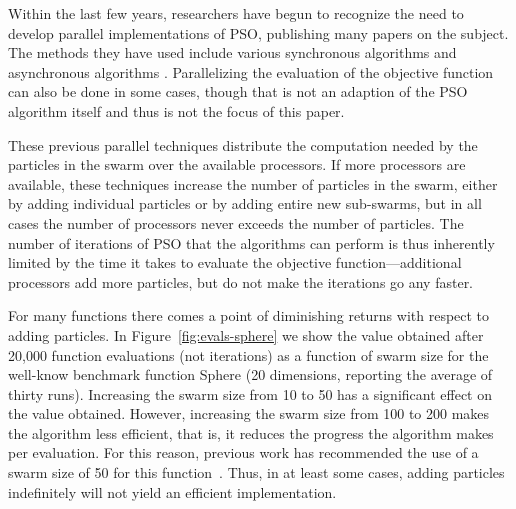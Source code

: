 \documentclass[journal,letterpaper]{IEEEtran}
\newcommand{\fig}[1]{Figure~\ref{fig:#1}}
\begin{document}
Within the last few years, researchers have begun to recognize the need to
develop parallel implementations of PSO, publishing many papers on the subject.
The methods they have used include various synchronous algorithms
\cite{mcnabb-2007-parallel-pso-using-mapreduce,belal-2004-parallel-models-for-pso,chu-2006-intelligent-parallel-pso,jin-2005-pso-antenna-designs,parsopoulos-2004-parallel-vector-evaluated-pso,schutte-2004-parallel-global-optimization-with-pso}
and asynchronous algorithms
\cite{koh-2006-parallel-asynchronous-pso,mostaghim-2006-multi-objective-pso-on-grids,venter-2005-parallel-pso-asynchronous-evaluations}.  Parallelizing the
evaluation of the objective function can also be done in some cases, though
that is not an adaption of the PSO algorithm itself and thus is not the focus
of this paper.

These previous parallel techniques distribute the computation needed by the
particles in the swarm over the available processors.  If more processors are
available, these techniques increase the number of particles in the swarm,
either by adding individual particles or by adding entire new sub-swarms, but
in all cases the number of processors never exceeds the number of particles.
The number of iterations of PSO that the algorithms can perform is thus
inherently limited by the time it takes to evaluate the objective
function---additional processors add more particles, but do not make the
iterations go any faster.

For many functions there comes a point of diminishing returns with respect to
adding particles.  In \fig{evals-sphere} we show the value obtained after
20,000 function evaluations (not iterations) as a function of swarm size for
the well-know benchmark function Sphere (20 dimensions, reporting the average
of thirty runs).  Increasing the swarm size from 10 to 50 has a significant
effect on the value obtained.  However, increasing the swarm size from 100 to
200 makes the algorithm less efficient, that is, it reduces the progress the
algorithm makes per evaluation.  For this reason, previous work has recommended
the use of a swarm size of 50 for this function~\cite{bratton-2007-defining-a-standard-for-pso}.  Thus, in
at least some cases, adding particles indefinitely will not yield an efficient
implementation. 
\end{document}
